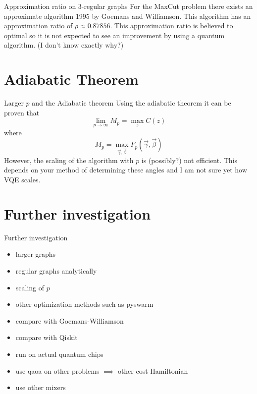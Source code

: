 \documentclass{beamer}
\begin{document}
\begin{frame}{Approximation ratio on 3-regular graphs}
For the  MaxCut problem there exists an approximate algorithm 1995 by Goemans and Williamson. This algorithm has an approximation ratio of  $\rho \approx 0.87856$. This approximation ratio is believed to optimal so it is not expected to see an improvement by using a quantum algorithm. (I don't know exactly why?)
\end{frame}


\section{Adiabatic Theorem}
\begin{frame}{Larger $p$ and the Adiabatic theorem}
	Using the adiabatic theorem it can be proven that
	\begin{equation}
		\lim_{p\to \infty} M_{p} = \max_{z} C(z)
	\end{equation}
	where
	\begin{equation}
	M_{p} = \max_{\vec{\gamma},\vec{\beta}} F_p(\vec{\gamma},\vec{\beta})
	\end{equation}
	However, the scaling of the algorithm with $p$ is (possibly?) not efficient. This depends on your method of determining these angles and I am not sure yet how VQE scales. %
\end{frame}

\section{Further investigation}
\begin{frame}{Further investigation}
	\begin{itemize}
		\item larger graphs
		\item regular graphs analytically
		\item scaling of $p$
		\item other optimization methods such as pyswarm
		\item compare with Goemans-Williamson
		\item compare with Qiskit
		\item run on actual quantum chips
		\item use qaoa on other problems $\implies$ other cost Hamiltonian
		\item use other mixers
	\end{itemize}
\end{frame}
\end{document}
